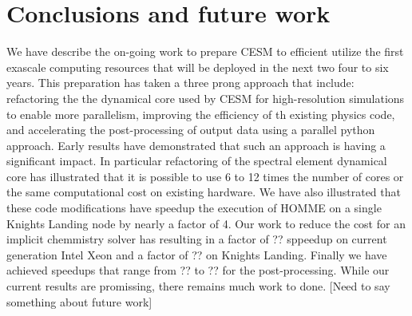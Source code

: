 \section{Conclusions and future work}\label{sec:conclusion}

We have describe the on-going work to prepare CESM to efficient utilize the first exascale 
computing resources that will be deployed in the next two four to six years.  This preparation has taken 
a three prong approach that include: refactoring the the dynamical core used by CESM for high-resolution 
simulations to enable more parallelism, improving the efficiency of th existing physics code, and accelerating 
the post-processing of output data using a parallel python approach.  Early results have demonstrated that
such an approach is having a significant impact.  In particular refactoring of the spectral element dynamical core 
has illustrated that it is possible to use 6 to 12 times the number of cores or the same computational cost on existing 
hardware. We have also illustrated that these code modifications have speedup the execution of HOMME on a single Knights 
Landing node by nearly a factor of 4.  Our work to reduce the cost for an implicit chemmistry solver has resulting in a 
factor of ?? sppeedup on current generation Intel Xeon and a factor of ?? on Knights Landing.  Finally we have achieved 
speedups that range from ?? to ?? for the post-processing.  While our current results are promissing, there remains 
much work to done. {\color{red} [Need to say something about future work]}
